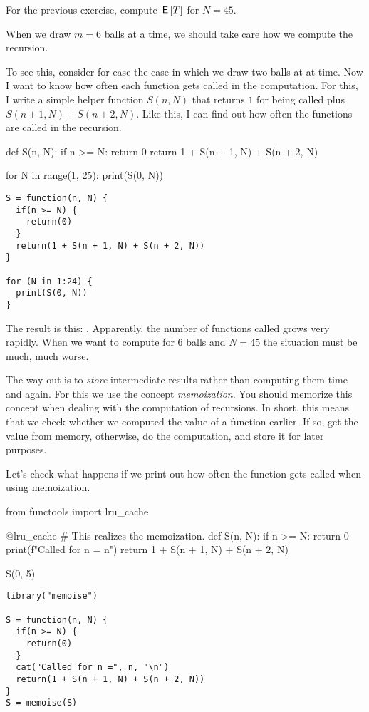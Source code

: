 \documentclass[lectures]{subfiles}
\begin{document}
\begin{exercise}
For the previous exercise, compute $\,\mathsf{E}\left[T\right]$ for $N=45$.
\begin{solution}
  When we draw $m=6$ balls at a time, we should take care how we compute the recursion.

  To see this, consider for ease the case in which we draw two balls at at time.  Now I want to know how often each function gets called in the computation. For this, I write a simple helper function $S(n, N)$ that returns $1$ for being called plus $S(n+1, N) + S(n+2, N)$. Like this, I can find out how often the functions are called in the recursion.

\begin{pyblock}
def S(n, N):
    if n >= N:
        return 0
    return 1 + S(n + 1, N) + S(n + 2, N)


for N in range(1, 25):
    print(S(0, N))
\end{pyblock}
\begin{verbatim}
S = function(n, N) {
  if(n >= N) {
    return(0)
  }
  return(1 + S(n + 1, N) + S(n + 2, N))
}

for (N in 1:24) {
  print(S(0, N))
}
\end{verbatim}
The result is this: \printpythontex.
Apparently, the number of functions called grows very rapidly.
When we want to compute for 6 balls and $N=45$ the situation must be much, much worse.

The way out is to \emph{store} intermediate results rather than computing them time and again.
For this we use the concept \emph{memoization}.
You should memorize this concept when dealing with the computation of recursions.
In short, this means that we check whether we computed the value of a function earlier.
If so, get the value from memory, otherwise, do the computation, and store it for later purposes.

Let's check what happens if we print out how often the function gets called when using memoization.
\begin{pyblock}
from functools import lru_cache

@lru_cache   # This realizes the memoization.
def S(n, N):
    if n >= N:
        return 0
    print(f"Called for n = {n}\n")
    return 1 + S(n + 1, N) + S(n + 2, N)


S(0, 5)
\end{pyblock}
\begin{verbatim}
library("memoise")

S = function(n, N) {
  if(n >= N) {
    return(0)
  }
  cat("Called for n =", n, "\n")
  return(1 + S(n + 1, N) + S(n + 2, N))
}
S = memoise(S)


\end{verbatim}
\end{solution}
\end{exercise}
\end{document}
